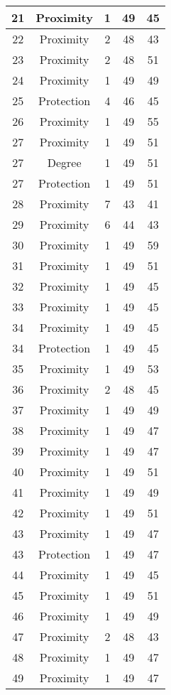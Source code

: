 \documentclass[results.tex]{subfiles}
\begin{document}
\begin{center}
\begin{tabular}{| c || c | c | c | c |}
    \hline
    21 & Proximity & 1 & 49 & 45 \\ 
    \hline
    22 & Proximity & 2 & 48 & 43 \\ 
    \hline
    23 & Proximity & 2 & 48 & 51 \\ 
    \hline
    24 & Proximity & 1 & 49 & 49 \\ 
    \hline
    25 & Protection & 4 & 46 & 45 \\ 
    \hline
    26 & Proximity & 1 & 49 & 55 \\ 
    \hline
    27 & Proximity & 1 & 49 & 51 \\ 
    \hline
    27 & Degree & 1 & 49 & 51 \\ 
    \hline
    27 & Protection & 1 & 49 & 51 \\ 
    \hline
    28 & Proximity & 7 & 43 & 41 \\ 
    \hline
    29 & Proximity & 6 & 44 & 43 \\ 
    \hline
    30 & Proximity & 1 & 49 & 59 \\ 
    \hline
    31 & Proximity & 1 & 49 & 51 \\ 
    \hline
    32 & Proximity & 1 & 49 & 45 \\ 
    \hline
    33 & Proximity & 1 & 49 & 45 \\ 
    \hline
    34 & Proximity & 1 & 49 & 45 \\ 
    \hline
    34 & Protection & 1 & 49 & 45 \\ 
    \hline
    35 & Proximity & 1 & 49 & 53 \\ 
    \hline
    36 & Proximity & 2 & 48 & 45 \\ 
    \hline
    37 & Proximity & 1 & 49 & 49 \\ 
    \hline
    38 & Proximity & 1 & 49 & 47 \\ 
    \hline
    39 & Proximity & 1 & 49 & 47 \\ 
    \hline
    40 & Proximity & 1 & 49 & 51 \\ 
    \hline
    41 & Proximity & 1 & 49 & 49 \\ 
    \hline
    42 & Proximity & 1 & 49 & 51 \\ 
    \hline
    43 & Proximity & 1 & 49 & 47 \\ 
    \hline
    43 & Protection & 1 & 49 & 47 \\ 
    \hline
    44 & Proximity & 1 & 49 & 45 \\ 
    \hline
    45 & Proximity & 1 & 49 & 51 \\ 
    \hline
    46 & Proximity & 1 & 49 & 49 \\ 
    \hline
    47 & Proximity & 2 & 48 & 43 \\ 
    \hline
    48 & Proximity & 1 & 49 & 47 \\ 
    \hline
    49 & Proximity & 1 & 49 & 47 \\ 
    \hline   \end{tabular}
\end{center}
\end{document}
